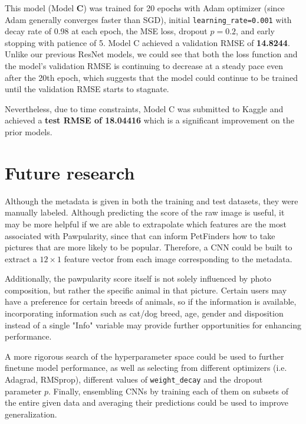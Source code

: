 \documentclass[12pt]{article}
\begin{document}
This model (Model \textbf{C}) was trained for 20 epochs with Adam optimizer (since Adam generally converges faster than SGD), initial \texttt{learning\_rate=0.001} with decay rate of 0.98 at each epoch, the MSE loss, dropout $p=0.2$, and early stopping with patience of 5. Model C achieved a validation RMSE of \textbf{14.8244}. Unlike our previous ResNet models, we could see that both the loss function and the model's validation RMSE is continuing to decrease at a steady pace even after the 20th epoch, which suggests that the model could continue to be trained until the validation RMSE starts to stagnate.\newline

Nevertheless, due to time constraints, Model C was submitted to Kaggle and achieved a \textbf{test RMSE of 18.04416} which is a significant improvement on the prior models.

\section{Future research}

Although the metadata is given in both the training and test datasets, they were manually labeled. Although predicting the score of the raw image is useful, it may be more helpful if we are able to extrapolate which features are the most associated with Pawpularity, since that can inform PetFinders how to take pictures that are more likely to be popular. Therefore, a CNN could be built to extract a $12\times 1$ feature vector from each image corresponding to the metadata.\newline

Additionally, the pawpularity score itself is not solely influenced by photo composition, but rather the specific animal in that picture. Certain users may have a preference for certain breeds of animals, so if the information is available, incorporating information such as cat/dog breed, age, gender and disposition instead of a single "Info" variable may provide further opportunities for enhancing performance.\newline

A more rigorous search of the hyperparameter space could be used to further finetune model performance, as well as selecting from different optimizers (i.e. Adagrad, RMSprop), different values of \texttt{weight\_decay} and the dropout parameter $p$. Finally, ensembling CNNs by training each of them on subsets of the entire given data and averaging their predictions could be used to improve generalization.
\end{document}
